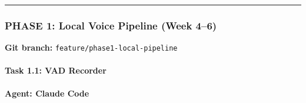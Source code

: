 \documentclass[
  11pt,
]{article}
\newcommand{\passthrough}[1]{#1}
\begin{document}
\begin{center}\rule{0.5\linewidth}{0.5pt}\end{center}

\hypertarget{phase-1-local-voice-pipeline-week-46}{%
\subsubsection{PHASE 1: Local Voice Pipeline (Week
4--6)}\label{phase-1-local-voice-pipeline-week-46}}

\textbf{Git branch:}
\passthrough{\lstinline!feature/phase1-local-pipeline!}

\hypertarget{task-1.1-vad-recorder}{%
\paragraph{Task 1.1: VAD Recorder}\label{task-1.1-vad-recorder}}

\textbf{Agent: Claude Code}
\end{document}
